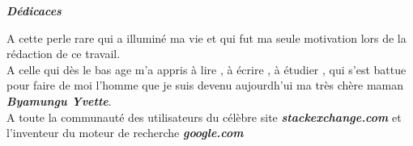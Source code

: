 \newenvironment{dedication}
{
	\thispagestyle{empty}%
	\vspace*{\stretch{1}}%
	\itshape             %
}
{\par %
	\vspace{\stretch{3}} %
}
\begin{center}
	 {\Large \textit {\textbf{Dédicaces }}} 	
\end{center}
\begin{dedication}
A cette perle rare qui a illuminé ma vie et qui fut ma seule motivation lors de la rédaction de ce travail.\\
A celle qui dès le bas age m'a appris à lire , à écrire , à étudier , qui s'est battue pour faire de moi l'homme que je suis devenu aujourdh'ui ma très chère maman \textbf{\textit{Byamungu Yvette}}.\\
A toute la communauté des  utilisateurs du célèbre site \textbf{\textit{stackexchange.com}} et l'inventeur du moteur de recherche \textbf{\textit{google.com}}
\end{dedication}






